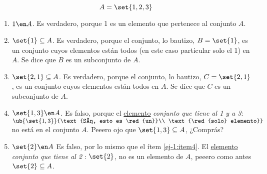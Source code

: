 $$
  A = \set{1,2,3}
$$
\begin{enumerate}[label=(\roman*)]
  \item $1 \en A$. Es verdadero, porque 1 es un elemento que pertenece al conjunto $A$.

  \item $\set{1} \subseteq A$. Es verdadero, porque el conjunto, lo bautizo, $B = \set{1}$,
        es un conjunto cuyos elementos están todos (en este caso particular solo el 1) en $A$. Se dice que $B$ es un subconjunto de $A$.

  \item $\set{2,1} \subseteq A$. Es verdadero, porque el conjunto, lo bautizo, $C = \set{2,1}$,
        es un conjunto cuyos elementos están todos en $A$. Se dice que $C$ es un subconjunto de $A$.

  \item\label{ej-1:item4} $\set{1,3} \en A$. Es falso, porque el \ul{elemento} \textit{conjunto que tiene al 1 y a 3}: $\ub{\set{1,3}}{\text{Sí, esto es \red{un}}\\ \text{\red{solo} elemento}}$ no está en el conjunto $A$.
        Peeero ojo que $\set{1,3} \subseteq A$, ¿Comprás?

  \item $\set{2} \en A$ Es falso, por lo mismo que el ítem \ref{ej-1:item4}. El \ul{elemento} \textit{conjunto que tiene al 2} : $\set{2}$, no es un elemento de $A$,
        peeero como antes $\set{2} \subseteq A$.
\end{enumerate}

\begin{aportes}
  \item {}
\end{aportes}
